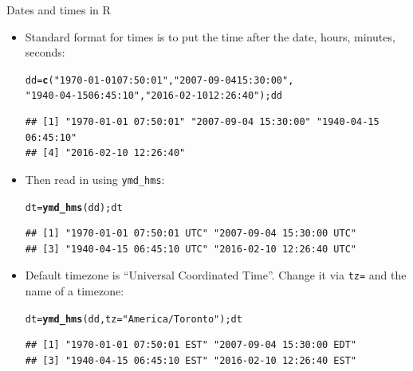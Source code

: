 \documentclass[unknownkeysallowed]{beamer}\usepackage[]{graphicx}\usepackage[]{color}
\makeatletter
\newcommand{\hlstr}[1]{\textcolor[rgb]{0.192,0.494,0.8}{#1}}%
\newcommand{\hlstd}[1]{\textcolor[rgb]{0.345,0.345,0.345}{#1}}%
\newcommand{\hlkwb}[1]{\textcolor[rgb]{0.69,0.353,0.396}{#1}}%
\newcommand{\hlkwc}[1]{\textcolor[rgb]{0.333,0.667,0.333}{#1}}%
\newcommand{\hlkwd}[1]{\textcolor[rgb]{0.737,0.353,0.396}{\textbf{#1}}}%
\newenvironment{kframe}{%
 \def\at@end@of@kframe{}%
 \ifinner\ifhmode%
  \def\at@end@of@kframe{\end{minipage}}%
  \begin{minipage}{\columnwidth}%
 \fi\fi%
 \def\FrameCommand##1{\hskip\@totalleftmargin \hskip-\fboxsep
 \colorbox{shadecolor}{##1}\hskip-\fboxsep
     \hskip-\linewidth \hskip-\@totalleftmargin \hskip\columnwidth}%
 \MakeFramed {\advance\hsize-\width
   \@totalleftmargin\z@ \linewidth\hsize
   \@setminipage}}%
 {\par\unskip\endMakeFramed%
 \at@end@of@kframe}
\newenvironment{knitrout}{}{} %
\makeatother
\begin{document}
\begin{frame}[fragile]{Dates and times in R}
  
  \begin{itemize}
  \item Standard format for times is to put the time after the
    date, hours, minutes, seconds:
  
    \begin{footnotesize}
\begin{knitrout}
\color{fgcolor}\begin{kframe}
\begin{alltt}
\hlstd{dd}\hlkwb{=}\hlkwd{c}\hlstd{(}\hlstr{"1970-01-01 07:50:01"}\hlstd{,}\hlstr{"2007-09-04 15:30:00"}\hlstd{,}
\hlstr{"1940-04-15 06:45:10"}\hlstd{,}\hlstr{"2016-02-10 12:26:40"}\hlstd{) ; dd}
\end{alltt}
\begin{verbatim}
## [1] "1970-01-01 07:50:01" "2007-09-04 15:30:00" "1940-04-15 06:45:10"
## [4] "2016-02-10 12:26:40"
\end{verbatim}
\end{kframe}
\end{knitrout}
      
    \end{footnotesize}
\item Then read in using \verb+ymd_hms+:
  \begin{footnotesize}
\begin{knitrout}
\color{fgcolor}\begin{kframe}
\begin{alltt}
\hlstd{dt}\hlkwb{=}\hlkwd{ymd_hms}\hlstd{(dd) ; dt}
\end{alltt}
\begin{verbatim}
## [1] "1970-01-01 07:50:01 UTC" "2007-09-04 15:30:00 UTC"
## [3] "1940-04-15 06:45:10 UTC" "2016-02-10 12:26:40 UTC"
\end{verbatim}
\end{kframe}
\end{knitrout}
  \end{footnotesize}
\item Default timezone is ``Universal Coordinated Time''. Change it
  via \texttt{tz=} and the name of a timezone:
  \begin{footnotesize}
\begin{knitrout}
\color{fgcolor}\begin{kframe}
\begin{alltt}
\hlstd{dt}\hlkwb{=}\hlkwd{ymd_hms}\hlstd{(dd,}\hlkwc{tz}\hlstd{=}\hlstr{"America/Toronto"}\hlstd{) ; dt}
\end{alltt}
\begin{verbatim}
## [1] "1970-01-01 07:50:01 EST" "2007-09-04 15:30:00 EDT"
## [3] "1940-04-15 06:45:10 EST" "2016-02-10 12:26:40 EST"
\end{verbatim}
\end{kframe}
\end{knitrout}
    

\end{footnotesize}
\end{itemize}
\end{frame}
\end{document}
